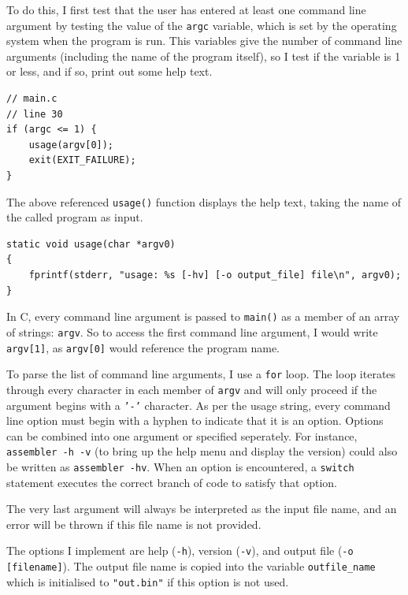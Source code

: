 \documentclass[a4paper]{report}
\begin{document}
To do this, I first test that the user has entered at least one command line
argument by testing the value of the \texttt{argc} variable, which is set
by the operating system when the program is run. This variables give the number
of command line arguments (including the name of the program itself), so I test
if the variable is 1 or less, and if so, print out some help text.

\begin{lstlisting}
// main.c
// line 30
if (argc <= 1) {
	usage(argv[0]);
	exit(EXIT_FAILURE);
}
\end{lstlisting}

The above referenced \texttt{usage()} function displays the help text, taking
the name of the called program as input.

\begin{lstlisting}
static void usage(char *argv0)
{
    fprintf(stderr, "usage: %s [-hv] [-o output_file] file\n", argv0);
}
\end{lstlisting}

In C, every command line argument is passed to \texttt{main()} as a member of an
array of strings: \texttt{argv}. So to access the first command line argument, I
would write \texttt{argv[1]}, as \texttt{argv[0]} would reference the program
name.

To parse the list of command line arguments, I use a \texttt{for} loop. The
loop iterates through every character in each member of \texttt{argv} and will
only proceed if the argument begins with a \texttt{'-'} character. As per the
usage string, every command line option must begin with a hyphen to indicate
that it is an option. Options can be combined into one argument or specified
seperately. For instance, \texttt{assembler -h -v} (to bring up the help menu
and display the version) could also be written as \texttt{assembler -hv}. When
an option is encountered, a \texttt{switch} statement executes the correct
branch of code to satisfy that option.

The very last argument will always be interpreted as the input file name, and
an error will be thrown if this file name is not provided.

The options I implement are help (\texttt{-h}), version (\texttt{-v}), and
output file (\texttt{-o [filename]}). The output file name is copied into the
variable \texttt{outfile\_name} which is initialised to \texttt{"out.bin"} if
this option is not used.
\end{document}
